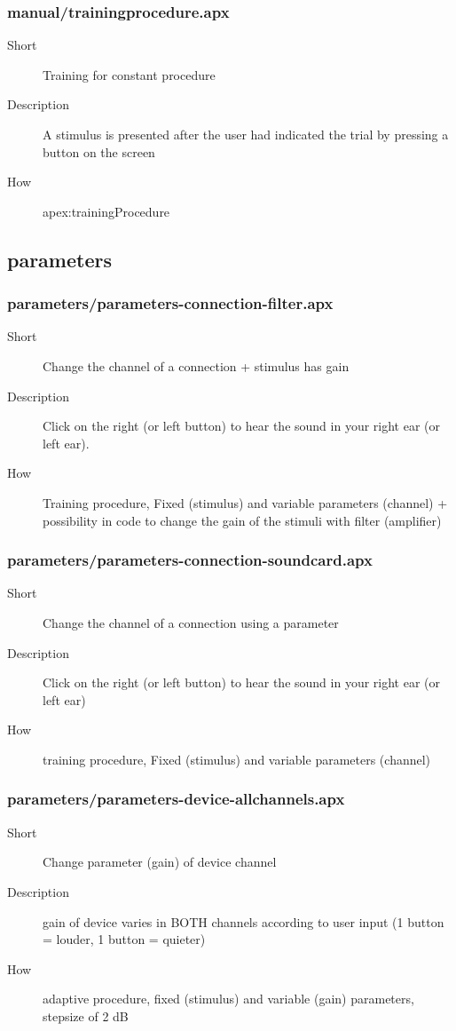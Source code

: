 \subsubsection{manual/trainingprocedure.apx}
\begin{description}
\item[Short] 
 Training for constant procedure
\item[Description] 
 A stimulus is presented after the user had indicated the trial by pressing a button on the screen
\item[How] 
 apex:trainingProcedure
\end{description}

\subsection{parameters}
\subsubsection{parameters/parameters-connection-filter.apx}
\begin{description}
\item[Short] 
 Change the channel of a connection + stimulus has gain
\item[Description] 
 Click on the right (or left button) to hear the sound in your right ear (or left ear).
\item[How] 
 Training procedure, Fixed (stimulus) and variable parameters (channel) + possibility in code to change the gain of the stimuli with filter (amplifier)
\end{description}

\subsubsection{parameters/parameters-connection-soundcard.apx}
\begin{description}
\item[Short] 
 Change the channel of a connection using a parameter
\item[Description] 
 Click on the right (or left button) to hear the sound in your right ear (or left ear)
\item[How] 
 training procedure, Fixed (stimulus) and variable parameters (channel)
\end{description}

\subsubsection{parameters/parameters-device-allchannels.apx}
\begin{description}
\item[Short] 
 Change parameter (gain) of device channel
\item[Description] 
 gain of device varies in BOTH channels according to user input (1 button = louder, 1 button = quieter)
\item[How] 
 adaptive procedure, fixed (stimulus) and variable (gain) parameters, stepsize of 2 dB
\end{description}

